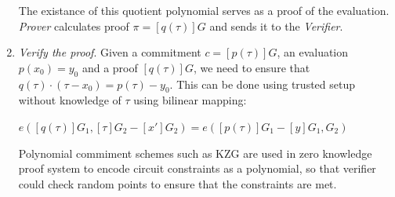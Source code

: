 \documentclass[../lecture-notes.tex]{subfiles}
\begin{document}
\begin{enumerate}
    The existance of this quotient polynomial serves
    as a proof of the evaluation. \textit{Prover} calculates proof $\pi = [q(\tau)]G$ and sends it to the \textit{Verifier}.

    \item \textit{Verify the proof}. Given a commitment $c = [p(\tau)]G$, an evaluation $p(x_0) = y_0$ and a proof $[q(\tau)]G$, we need to
    ensure that $q(\tau) \cdot (\tau - x_0) = p(\tau) - y_0$. This can be done using trusted setup without knowledge of $\tau$ using bilinear mapping:

    \begin{center}
        $e([q(\tau)]G_1, [\tau]G_2 - [x']G_2) = e([p(\tau)]G_1 - [y]G_1, G_2)$
    \end{center}
    
    Polynomial commiment schemes such as KZG are used in zero knowledge proof system to encode circuit constraints as a polynomial, 
    so that verifier could check random points to ensure that the constraints are met.

\end{enumerate}
\end{document}
